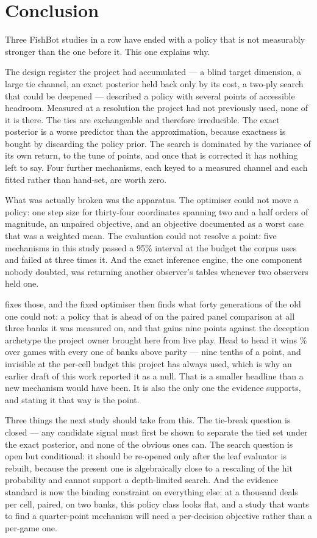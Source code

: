 \section{Conclusion}
\label{sec:conclusion}

Three FishBot studies in a row have ended with a policy that is not measurably stronger than the one
before it. This one explains why.

The design register the project had accumulated --- a blind target dimension, a large tie channel, an
exact posterior held back only by its cost, a two-ply search that could be deepened --- described a
policy with several points of accessible headroom. Measured at a resolution the project had not
previously used, none of it is there. The ties are exchangeable and therefore irreducible. The exact
posterior is a worse predictor than the approximation, because exactness is bought by discarding the
policy prior. The search is dominated by the variance of its own return, to the tune of \vsixCurseGap{} points,
and once that is corrected it has nothing left to say. Four further mechanisms, each keyed to a
measured channel and each fitted rather than hand-set, are worth zero.

What was actually broken was the apparatus. The optimiser could not move a policy: one step size for
thirty-four coordinates spanning two and a half orders of magnitude, an unpaired objective, and an
objective documented as a worst case that was a weighted mean. The evaluation could not resolve a
point: five mechanisms in this study passed a 95\% interval at the budget the corpus uses and failed
at three times it. And the exact inference engine, the one component nobody doubted, was returning
another observer's tables whenever two observers held one.

\vsix{} fixes those, and the fixed optimiser then finds what forty generations of the old one could
not: a policy that is ahead of \vfive{} on the paired panel comparison at all three banks it was
measured on, and that gains nine points against the deception archetype the project owner brought
here from live play. Head to head it wins \vsixBigFive\% over \vsixBigFiveN{} games with every one of
\vsixBigFiveBanks{} banks above parity --- nine tenths of a point, and invisible at the per-cell
budget this project has always used, which is why an earlier draft of this work reported it as a
null. That is a
smaller headline than a new mechanism would have been. It is also the only one the evidence
supports, and stating it that way is the point.

Three things the next study should take from this. The tie-break question is closed --- any candidate
signal must first be shown to separate the tied set under the exact posterior, and none of the
obvious ones can. The search question is open but conditional: it should be re-opened only after the
leaf evaluator is rebuilt, because the present one is algebraically close to a rescaling of the hit
probability and cannot support a depth-limited search. And the evidence standard is now the binding
constraint on everything else: at a thousand deals per cell, paired, on two banks, this policy class
looks flat, and a study that wants to find a quarter-point mechanism will need a per-decision
objective rather than a per-game one.
